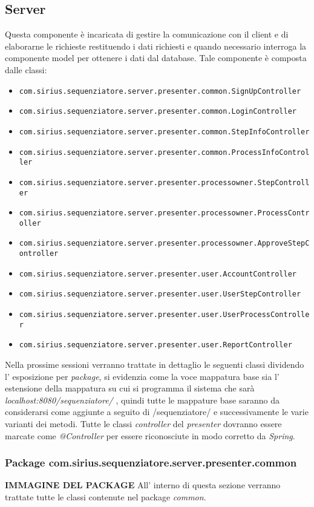 \subsection{Server}
Questa componente è incaricata di gestire la comunicazione con il client e di elaborarne le richieste restituendo i dati richiesti e quando necessario interroga la componente model per ottenere i dati dal database.
Tale componente è composta dalle classi:
\begin{itemize}
	\item \texttt{com.sirius.sequenziatore.server.presenter.common.SignUpController}
	\item \texttt{com.sirius.sequenziatore.server.presenter.common.LoginController}
	\item \texttt{com.sirius.sequenziatore.server.presenter.common.StepInfoController}
	\item \texttt{com.sirius.sequenziatore.server.presenter.common.ProcessInfoController}
	\item \texttt{com.sirius.sequenziatore.server.presenter.processowner.StepController}
	\item \texttt{com.sirius.sequenziatore.server.presenter.processowner.ProcessController}
	\item \texttt{com.sirius.sequenziatore.server.presenter.processowner.ApproveStepController}
	\item \texttt{com.sirius.sequenziatore.server.presenter.user.AccountController}
	\item \texttt{com.sirius.sequenziatore.server.presenter.user.UserStepController}
	\item \texttt{com.sirius.sequenziatore.server.presenter.user.UserProcessController}
	\item \texttt{com.sirius.sequenziatore.server.presenter.user.ReportController}
\end{itemize}
Nella prossime sessioni verranno trattate in dettaglio le seguenti classi dividendo l' esposizione per \textit{package}, si evidenzia come la voce mappatura base sia l' estensione della mappatura su cui si programma il sistema che sarà \textit{localhost:8080/sequenziatore/} , quindi tutte le mappature base saranno da considerarsi come aggiunte a seguito di /sequenziatore/ e successivamente le varie varianti dei metodi.
Tutte le classi \textit{controller} del \textit{presenter} dovranno essere marcate come \textit{@Controller} per essere riconosciute in modo corretto da \textit{Spring}.
\subsubsection{Package com.sirius.sequenziatore.server.presenter.common}
\textbf{IMMAGINE DEL PACKAGE}
All' interno di questa sezione verranno trattate tutte le classi contenute nel package \textit{common}.
